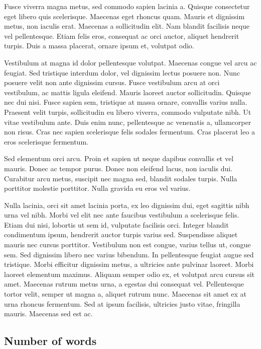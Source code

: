 \documentclass[10pt]{article}
\begin{document}
	Fusce viverra magna metus, sed commodo sapien lacinia a. Quisque consectetur eget libero quis scelerisque. Maecenas eget rhoncus quam. Mauris et dignissim metus, non iaculis erat. Maecenas a sollicitudin elit. Nam blandit facilisis neque vel pellentesque. Etiam felis eros, consequat ac orci auctor, aliquet hendrerit turpis. Duis a massa placerat, ornare ipsum et, volutpat odio.
	
	Vestibulum at magna id dolor pellentesque volutpat. Maecenas congue vel arcu ac feugiat. Sed tristique interdum dolor, vel dignissim lectus posuere non. Nunc posuere velit non ante dignissim cursus. Fusce vestibulum arcu at orci vestibulum, ac mattis ligula eleifend. Mauris laoreet auctor sollicitudin. Quisque nec dui nisi. Fusce sapien sem, tristique at massa ornare, convallis varius nulla. Praesent velit turpis, sollicitudin eu libero viverra, commodo vulputate nibh. Ut vitae vestibulum ante. Duis enim nunc, pellentesque ac venenatis a, ullamcorper non risus. Cras nec sapien scelerisque felis sodales fermentum. Cras placerat leo a eros scelerisque fermentum.
	
	Sed elementum orci arcu. Proin et sapien ut neque dapibus convallis et vel mauris. Donec ac tempor purus. Donec non eleifend lacus, non iaculis dui. Curabitur arcu metus, suscipit nec magna sed, blandit sodales turpis. Nulla porttitor molestie porttitor. Nulla gravida eu eros vel varius.
	
	Nulla lacinia, orci sit amet lacinia porta, ex leo dignissim dui, eget sagittis nibh urna vel nibh. Morbi vel elit nec ante faucibus vestibulum a scelerisque felis. Etiam dui nisi, lobortis ut sem id, vulputate facilisis orci. Integer blandit condimentum ipsum, hendrerit auctor turpis varius sed. Suspendisse aliquet mauris nec cursus porttitor. Vestibulum non est congue, varius tellus ut, congue sem. Sed dignissim libero nec varius bibendum. In pellentesque feugiat augue sed tristique. Morbi efficitur dignissim metus, a ultricies ante pulvinar laoreet. Morbi laoreet elementum maximus. Aliquam semper odio ex, et volutpat arcu cursus sit amet. Maecenas rutrum metus urna, a egestas dui consequat vel. Pellentesque tortor velit, semper ut magna a, aliquet rutrum nunc. Maecenas sit amet ex at urna rhoncus fermentum. Sed at ipsum facilisis, ultricies justo vitae, fringilla mauris. Maecenas sed est ac.
	
	
	\subsection{Number of words}
	
\end{document}
